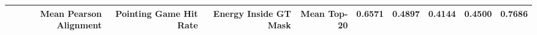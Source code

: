 \begin{tabular}{rrrrrr}
\toprule
Mean Pearson Alignment & Pointing Game Hit Rate & Energy Inside GT Mask & Mean Top-20%
 & 0.6571 & 0.4897 & 0.4144 & 0.4500 & 0.7686 \\
\bottomrule
\end{tabular}
